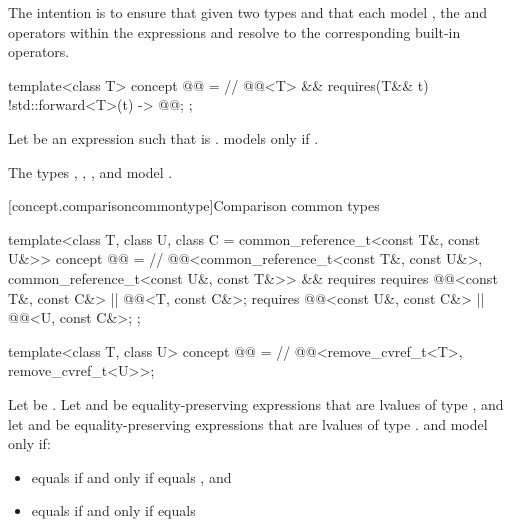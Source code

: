 \pnum
\begin{note}
The intention is to ensure that
given two types  and 
that each model ,
the \tcode{\&\&} and \tcode{||} operators within the expressions
 and
resolve to the corresponding built-in operators.
\end{note}

\begin{itemdecl}
template<class T>
  concept @@ =                // \expos
    @@<T> && requires(T&& t) {
      { !std::forward<T>(t) } -> @@;
    };
\end{itemdecl}

\pnum
Let  be an expression such that
 is .
 models  only if
.

\pnum
\begin{example}
The types
,
,
, and
model .
\end{example}

[concept.comparisoncommontype]{Comparison common types}

\begin{itemdecl}
template<class T, class U, class C = common_reference_t<const T&, const U&>>
  concept @@ =   // \expos
    @@<common_reference_t<const T&, const U&>,
            common_reference_t<const U&, const T&>> &&
    requires {
      requires @@<const T&, const C&> || @@<T, const C&>;
      requires @@<const U&, const C&> || @@<U, const C&>;
    };

template<class T, class U>
  concept @@ =   // \expos
    @@<remove_cvref_t<T>, remove_cvref_t<U>>;
\end{itemdecl}

\pnum
Let  be .
Let  and  be equality-preserving expressions
that are lvalues of type , and
let  and  be equality-preserving expressions
that are lvalues of type .
 and  model
 only if:
\begin{itemize}
\item
{} equals
if and only if  equals , and
\item
{} equals
if and only if  equals 
\end{itemize}

